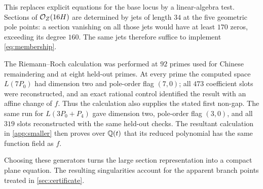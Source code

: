 This replaces explicit equations for the base locus by a linear-algebra
test. Sections of $\mathcal{O}_Z(16H)$ are determined by jets of length $34$ at
the five geometric pole points: a section vanishing on all those jets
would have at least $170$ zeros, exceeding its degree $160$.
The same jets therefore suffice to implement \eqref{eq:membership}.

The Riemann--Roch calculation was performed at $92$ primes used for Chinese
remaindering and at eight held-out primes.  At every prime the computed
space $L(7P_0)$ had dimension two and pole-order flag $(7,0)$; all $473$
coefficient slots were reconstructed, and an exact rational control
identified the result with an affine change of $f$.  Thus the calculation
also supplies the stated first non-gap.  The same run for
$L(3P_0+P_4)$ gave dimension two, pole-order flag $(3,0)$, and all $319$
slots reconstructed with the same held-out checks.  The resultant
calculation in \cref{app:smaller} then proves over $\mathbb{Q}(t)$ that its reduced
polynomial has the same function field as $f$.

Choosing these generators turns the large section representation into a
compact plane equation. The resulting singularities account for the
apparent branch points treated in \cref{sec:certificate}.
